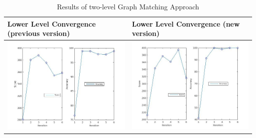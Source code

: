 \documentclass[
	fontsize=12pt,
	paper=a4,
	twoside=false,
	numbers=noenddot,
	plainheadsepline,
	toc=listof,
	toc=bibliography
]{scrartcl}
\begin{document}
\begin{table}
	[ht] \caption{Results of two-level Graph Matching Approach } \label{tab:stimuli}
	\begin{tabular}
		{|L{6cm}|L{6cm}|} \hline
		Lower Level Convergence (previous version) &  Lower Level Convergence (new version)\\ \hline
		\rule{0pt}{5cm}
		\parbox[b]{1em}{
			\includegraphics[scale = 0.28]{fig/method2/test1/accuracy_LL.jpg}} &
		\parbox[b]{1em}{
			\includegraphics[scale = 0.28]{test1/accuracy_LL.jpg}} \\			
		\hline	
		

\end{tabular}
\end{table}
\end{document}
